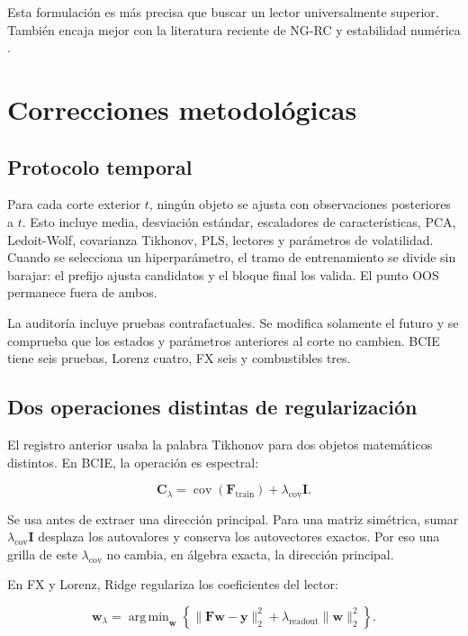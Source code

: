\documentclass[11pt]{article}
\DeclareMathOperator*{\argmin}{arg\,min}
\newcommand{\mat}[1]{\mathbf{#1}}
\newcommand{\vect}[1]{\mathbf{#1}}
\begin{document}
Esta formulación es más precisa que buscar un lector universalmente superior. También encaja
mejor con la literatura reciente de NG-RC y estabilidad numérica
\cite{zhang2025moredata,dossantos2025instability}.

\section{Correcciones metodológicas}

\subsection{Protocolo temporal}

Para cada corte exterior $t$, ningún objeto se ajusta con observaciones posteriores a $t$.
Esto incluye media, desviación estándar, escaladores de características, PCA, Ledoit-Wolf,
covarianza Tikhonov, PLS, lectores y parámetros de volatilidad. Cuando se selecciona un
hiperparámetro, el tramo de entrenamiento se divide sin barajar: el prefijo ajusta candidatos y
el bloque final los valida. El punto OOS permanece fuera de ambos.

La auditoría incluye pruebas contrafactuales. Se modifica solamente el futuro y se comprueba que
los estados y parámetros anteriores al corte no cambien. BCIE tiene seis pruebas, Lorenz
cuatro, FX seis y combustibles tres.

\subsection{Dos operaciones distintas de regularización}

El registro anterior usaba la palabra Tikhonov para dos objetos matemáticos distintos. En BCIE,
la operación es espectral:

\begin{equation}
\mat C_{\lambda}=\operatorname{cov}(\mat F_{\mathrm{train}})+\lambda_{\mathrm{cov}}\mat I.
\label{eq:covtikh}
\end{equation}

Se usa antes de extraer una dirección principal. Para una matriz simétrica, sumar
$\lambda_{\mathrm{cov}}\mat I$ desplaza los autovalores y conserva los autovectores exactos.
Por eso una grilla de este $\lambda_{\mathrm{cov}}$ no cambia, en álgebra exacta, la dirección
principal.

En FX y Lorenz, Ridge regulariza los coeficientes del lector:

\begin{equation}
\vect w_{\lambda}=\argmin_{\vect w}
\left\{\lVert \mat F\vect w-\vect y\rVert_2^2+\lambda_{\mathrm{readout}}
\lVert \vect w\rVert_2^2\right\}.
\label{eq:ridge}
\end{equation}
\end{document}
